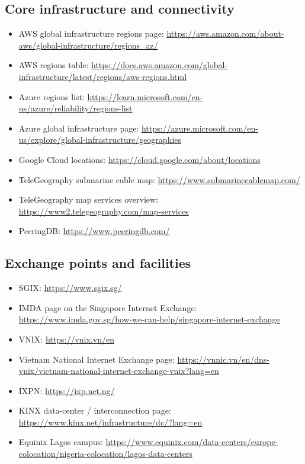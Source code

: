 \documentclass[11pt]{article}
\begin{document}
\subsection{Core infrastructure and connectivity}
\begin{itemize}[leftmargin=1.4em,itemsep=0.15em]
    \item AWS global infrastructure regions page: \url{https://aws.amazon.com/about-aws/global-infrastructure/regions_az/}
    \item AWS regions table: \url{https://docs.aws.amazon.com/global-infrastructure/latest/regions/aws-regions.html}
    \item Azure regions list: \url{https://learn.microsoft.com/en-us/azure/reliability/regions-list}
    \item Azure global infrastructure page: \url{https://azure.microsoft.com/en-us/explore/global-infrastructure/geographies}
    \item Google Cloud locations: \url{https://cloud.google.com/about/locations}
    \item TeleGeography submarine cable map: \url{https://www.submarinecablemap.com/}
    \item TeleGeography map services overview: \url{https://www2.telegeography.com/map-services}
    \item PeeringDB: \url{https://www.peeringdb.com/}
\end{itemize}

\subsection{Exchange points and facilities}
\begin{itemize}[leftmargin=1.4em,itemsep=0.15em]
    \item SGIX: \url{https://www.sgix.sg/}
    \item IMDA page on the Singapore Internet Exchange: \url{https://www.imda.gov.sg/how-we-can-help/singapore-internet-exchange}
    \item VNIX: \url{https://vnix.vn/en}
    \item Vietnam National Internet Exchange page: \url{https://vnnic.vn/en/dns-vnix/vietnam-national-internet-exchange-vnix?lang=en}
    \item IXPN: \url{https://ixp.net.ng/}
    \item KINX data-center / interconnection page: \url{https://www.kinx.net/infrastructure/dc/?lang=en}
    \item Equinix Lagos campus: \url{https://www.equinix.com/data-centers/europe-colocation/nigeria-colocation/lagos-data-centers}
\end{itemize}
\end{document}
